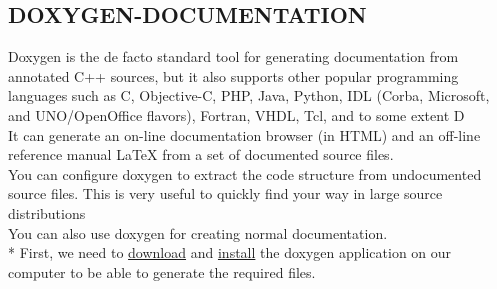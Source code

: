 \documentclass[11pt,utf8]{article}
\begin{document}
 \subsection{DOXYGEN-DOCUMENTATION}
\label{sec: documentation using DOXYGEN}
Doxygen is the de facto standard tool for generating documentation from annotated C++ sources, but it also supports other popular programming languages such as C, Objective-C, PHP, Java, Python, IDL (Corba, Microsoft, and UNO/OpenOffice flavors), Fortran, VHDL, Tcl, and to some extent D\\

It can generate an on-line documentation browser (in HTML) and an off-line reference manual LaTeX from a set of documented source files.\\
You can configure doxygen to extract the code structure from undocumented source files. This is very useful to quickly find your way in large source distributions\\
You can also use doxygen for creating normal documentation.\\*
First, we need to  \href{http://www.stack.nl/~dimitri/doxygen/download.html}{download}  and \href{http://www.stack.nl/~dimitri/doxygen/manual/install.html}{install} the doxygen application on our computer to be able to generate the required files.\\
\end{document}
